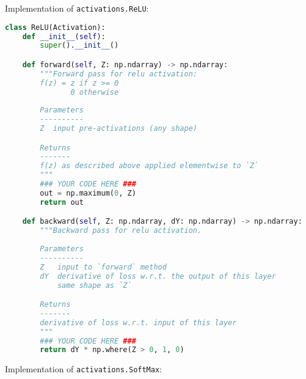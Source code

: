 Implementation of \texttt{activations.ReLU}:

\begin{lstlisting}[language=Python]
class ReLU(Activation):
    def __init__(self):
        super().__init__()

    def forward(self, Z: np.ndarray) -> np.ndarray:
        """Forward pass for relu activation:
        f(z) = z if z >= 0
               0 otherwise
        
        Parameters
        ----------
        Z  input pre-activations (any shape)

        Returns
        -------
        f(z) as described above applied elementwise to `Z`
        """
        ### YOUR CODE HERE ###
        out = np.maximum(0, Z)
        return out

    def backward(self, Z: np.ndarray, dY: np.ndarray) -> np.ndarray:
        """Backward pass for relu activation.
        
        Parameters
        ----------
        Z   input to `forward` method
        dY  derivative of loss w.r.t. the output of this layer
            same shape as `Z`

        Returns
        -------
        derivative of loss w.r.t. input of this layer
        """
        ### YOUR CODE HERE ###
        return dY * np.where(Z > 0, 1, 0)

\end{lstlisting}

Implementation of \texttt{activations.SoftMax}:

